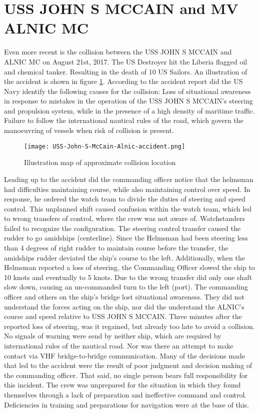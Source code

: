 \newpage
\section{USS JOHN S MCCAIN and MV ALNIC MC}
Even more recent is the collision between the USS JOHN S MCCAIN and ALNIC MC on August 21st, 2017. The US Destroyer hit the Liberia flagged oil and chemical tanker. Resulting in the death of 10  US Sailors. An illustration of the accident is shown in figure \ref{fig:Accident-USS-John-S-McCain-Alnic}. According to the accident report did the US Navy identify the following causes for the collision: Loss of situational awareness in response to mistakes in the operation of the USS JOHN S MCCAIN's steering and propulsion system, while in the presence of a high density of maritime traffic. Failure to follow the international nautical rules of the road, which govern the manoeuvring of vessels when risk of collision is present.

\begin{figure}[p]
	\centering
	\texttt{[image: USS-John-S-McCain-Alnic-accident.png]}
	\caption{Illustration map of approximate collision location}
	\label{fig:Accident-USS-John-S-McCain-Alnic}
\end{figure}

Leading up to the accident did the commanding officer notice that the helmsman had difficulties maintaining course, while also maintaining control over speed. In response, he ordered the watch team to divide the duties of steering and speed control. This unplanned shift caused confusion within the watch team, which led to wrong transfers of control, where the crew was not aware of. 
Watchstanders failed to recognize the configuration. The steering control transfer caused the rudder to go amidships (centerline). Since the Helmsman had been steering less than 4 degrees of right rudder to maintain course before the transfer, the amidships rudder deviated the ship’s course to the left. Additionally, when the Helmsman reported a loss of steering, the Commanding Officer slowed the ship to 10 knots and eventually to 5 knots. Due to the wrong transfer did only one shaft slow down, causing an un-commanded turn to the left (port). The commanding officer and others on the ship's bridge lost situational awareness. They did not understand the forces acting on the ship, nor did the understand the ALNIC's course and speed relative to USS JOHN S MCCAIN. Three minutes after the reported loss of steering, was it regained, but already too late to avoid a collision. No signals of warning were send by neither ship, which are required by international rules of the nautical road. Nor was there an attempt to make contact via \ac{VHF} bridge-to-bridge communication.
Many of the decisions made that led to the accident were the result of poor judgment and decision making of the commanding officer. That said, no single person bears full responsibility for this incident. The crew was unprepared for the situation in which they found themselves through a lack of preparation and ineffective command and control. Deficiencies in training and preparations for navigation were at the base of this. \cite{USNavy2017}

